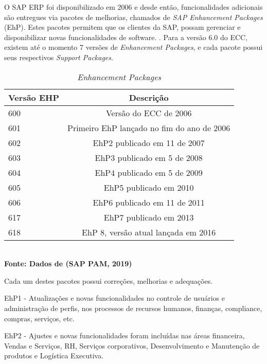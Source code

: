O SAP ERP foi disponibilizado em 2006 e desde então, funcionalidades adicionais são entregues via pacotes de melhorias, chamados de \textit{SAP Enhancement Packages} (EhP). Estes pacotes permitem que os clientes da SAP, possam gerenciar e disponibilizar novas funcionalidades de software. \cite{SAPERPEHP}.
Para a versão 6.0 do ECC, existem até o momento 7 versões de \textit{Enhancement Packages}, e cada pacote possui seus respectivos \textit{Support Packages}.\\

\begin{table}[htb]
	\centering
	\caption{\hspace{0.1cm} \textit{Enhancement Packages }}
	\vspace{-0.3cm} %
	\label{tab:tabela1}
	\begin{tabular}{l|c}
		\hline
		\textbf{Versão EHP}	& \textbf{Descrição} \\
		\hline
		600	& Versão do ECC de 2006                               \\
		601	& Primeiro EhP lançado no fim do ano de 2006          \\
		602	& EhP2 publicado em 11 de 2007                        \\
		603	& EhP3 publicado em 5 de 2008                         \\
		604	& EhP4 publicado em 5 de 2009                         \\
		605	& EhP5 publicado em 2010                              \\
		606	& EhP6 publicado em 11 de 2011                        \\
		617	& EhP7 publicado em 2013                              \\
		618	& EhP 8, versão atual lançada em 2016                 \\
		\hline
	\end{tabular}
	\vspace{.1cm}  %
	\small
	{\footnotesize\\ \textbf{Fonte: Dados de (SAP PAM, 2019)}}
\end{table}
\newpage
Cada um destes pacotes possui correções, melhorias e adequações.

EhP1 - Atualizações e novas funcionalidades no controle de usuários e administração de perfis, nos processos de recursos humanos, finanças, compliance, compras, serviços, etc.

EhP2 - Ajustes e novas funcionalidades foram incluídas nas áreas financeira, Vendas e Serviços, RH, Serviços corporativos, Desenvolvimento e Manutenção de produtos e Logística Executiva.

